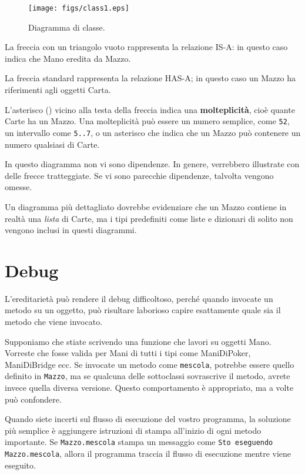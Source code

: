 \documentclass[10pt]{book}
\begin{document}
\begin{figure}
\centerline
{\texttt{[image: figs/class1.eps]}}
\caption{Diagramma di classe.}
\label{fig.class1}
\end{figure}


La freccia con un triangolo vuoto rappresenta la relazione IS-A: in questo caso indica che Mano eredita da Mazzo.

La freccia standard rappresenta la relazione HAS-A; in questo caso un Mazzo ha riferimenti agli oggetti Carta.

L'asterisco ({\tt *}) vicino alla testa della freccia indica una
{\bf molteplicità}, cioè quante Carte ha un Mazzo. Una molteplicità può essere un numero semplice, come {\tt 52}, un intervallo come {\tt 5..7}, o un asterisco che indica che un Mazzo può contenere un numero qualsiasi di Carte.

In questo diagramma non vi sono dipendenze. In genere, verrebbero illustrate con delle frecce tratteggiate. Se vi sono parecchie dipendenze, talvolta vengono omesse.

Un diagramma più dettagliato dovrebbe evidenziare che un Mazzo contiene in realtà una {\em lista} di Carte, ma i tipi predefiniti come liste e dizionari di solito non vengono inclusi in questi diagrammi.


\section{Debug}

L'ereditarietà può rendere il debug difficoltoso, perché quando invocate un metodo su un oggetto, può risultare laborioso capire esattamente quale sia il metodo che viene invocato.

Supponiamo che stiate scrivendo una funzione che lavori su oggetti Mano. Vorreste che fosse valida per Mani di tutti i tipi come ManiDiPoker, ManiDiBridge ecc. Se invocate un metodo come
{\tt mescola}, potrebbe essere quello definito in {\tt Mazzo},
ma se qualcuna delle sottoclassi sovrascrive il metodo, avrete invece quella diversa versione. Questo comportamento è appropriato, ma a volte può confondere.

Quando siete incerti sul flusso di esecuzione del vostro programma, la soluzione più semplice è aggiungere istruzioni di stampa all'inizio di ogni metodo importante. Se {\tt Mazzo.mescola} stampa un messaggio come {\tt Sto eseguendo Mazzo.mescola}, allora il programma traccia il flusso di esecuzione mentre viene eseguito.
\end{document}
